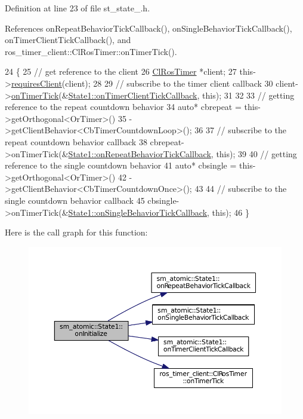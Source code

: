 Definition at line 23 of file st\+\_\+state\+\_.\+h.



References on\+Repeat\+Behavior\+Tick\+Callback(), on\+Single\+Behavior\+Tick\+Callback(), on\+Timer\+Client\+Tick\+Callback(), and ros\+\_\+timer\+\_\+client\+::\+Cl\+Ros\+Timer\+::on\+Timer\+Tick().


\begin{DoxyCode}
24     \{
25         \textcolor{comment}{// get reference to the client}
26         \hyperlink{classros__timer__client_1_1ClRosTimer}{ClRosTimer} *client;
27         this->\hyperlink{classsmacc_1_1ISmaccState_a7f95c9f0a6ea2d6f18d1aec0519de4ac}{requiresClient}(client);
28 
29         \textcolor{comment}{// subscribe to the timer client callback}
30         client->\hyperlink{classros__timer__client_1_1ClRosTimer_a06ecf6427b5df59f29879ab3bd1f120c}{onTimerTick}(&\hyperlink{structsm__atomic_1_1State1_adea28f0a0fcedb210a29656f53aeee09}{State1::onTimerClientTickCallback},
       \textcolor{keyword}{this});
31 
32 
33         \textcolor{comment}{// getting reference to the repeat countdown behavior}
34         \textcolor{keyword}{auto}* cbrepeat = this->getOrthogonal<OrTimer>()
35                               ->getClientBehavior<CbTimerCountdownLoop>();
36 
37         \textcolor{comment}{// subscribe to the repeat countdown behavior callback}
38         cbrepeat->onTimerTick(&\hyperlink{structsm__atomic_1_1State1_a9d2c943f02a8e0f1d7b86132ada1c6e0}{State1::onRepeatBehaviorTickCallback}, \textcolor{keyword}{
      this});
39 
40         \textcolor{comment}{// getting reference to the single countdown behavior}
41         \textcolor{keyword}{auto}* cbsingle = this->getOrthogonal<OrTimer>()
42                              ->getClientBehavior<CbTimerCountdownOnce>();
43 
44         \textcolor{comment}{// subscribe to the single countdown behavior callback}
45         cbsingle->onTimerTick(&\hyperlink{structsm__atomic_1_1State1_a9cb95d91cf5a22f0d9d079dc04bf58aa}{State1::onSingleBehaviorTickCallback}, \textcolor{keyword}{
      this});
46     \}
\end{DoxyCode}


Here is the call graph for this function\+:
\nopagebreak
\begin{figure}[H]
\begin{center}
\leavevmode
\includegraphics[width=350pt]{structsm__atomic_1_1State1_a13084492414b7b478f9f4b78a749c020_cgraph}
\end{center}
\end{figure}


